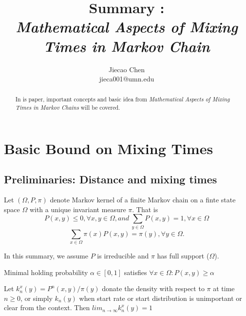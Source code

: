 \documentclass[12pt,reqno]{amsart}
\begin{document}
\title[Short version of title]{Summary : \\ \small \emph{Mathematical Aspects of Mixing Times in Markov Chain}}
\author{Jiecao Chen \\ \tiny jieca001@umn.edu }

\maketitle

\begin{abstract}
In is paper, important concepts and basic idea from \textit{Mathematical Aspects of Mixing Times in Markov Chains} will be covered.
\end{abstract}

\section{Basic Bound on Mixing Times}
\label{math}

\subsection{Preliminaries: Distance and mixing times}

Let $(\Omega,P,\pi)$ denote Markov kernel of a finite Markov chain on a finte state
space $\Omega$ with a unique invariant measure $\pi$. That is 
\[ P(x,y)\leq 0, \forall x,y \in \Omega, and~ \sum_{y\in \Omega}P(x,y)=1, \forall x\in \Omega
\] 
\[
\sum_{x\in \Omega}\pi (x)P(x,y) = \pi(y), \forall y \in \Omega.
\]

In this summary, we assume $P$ is irreducible and $\pi$ has full support ($\Omega$).

Minimal holding probability $\alpha \in [0,1]$ satisfies $\forall x\in \Omega:
P(x,y) \geq \alpha$

Let $k_n^x(y)=P^n(x,y)/\pi(y)$ donate the density with respect to $\pi$ at time $n\geq 0$, or simply $k_n(y)$ when start rate or start distribution is unimportant or clear from the context. Then $lim_{n\rightarrow \infty}k_n^x(y) = 1$
\end{document}

